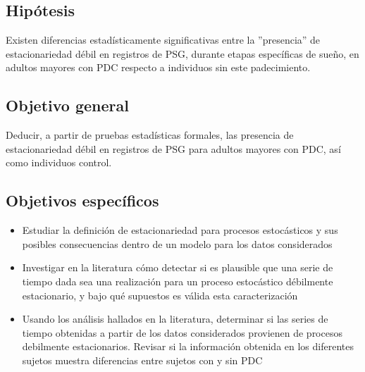 \documentclass[12pt,a4paper]{mitthesis}
\begin{document}

\subsection{Hip\'otesis}

Existen diferencias estad\'isticamente significativas entre la ''presencia'' de estacionariedad 
d\'ebil en registros de PSG, durante etapas espec\'ificas de sue\~no, en adultos mayores con PDC 
respecto a individuos sin este padecimiento.


\subsection{Objetivo general}

Deducir, a partir de pruebas estad\'isticas formales, las presencia de estacionariedad d\'ebil en
registros de PSG para adultos mayores con PDC, as\'i como individuos control.


\subsection{Objetivos espec\'ificos}

\begin{itemize}
\item Estudiar la definici\'on de estacionariedad para procesos estoc\'asticos y sus posibles 
consecuencias dentro de un modelo para los datos considerados

\item Investigar en la literatura c\'omo detectar si es plausible que una serie de tiempo dada sea 
una realizaci\'on para un proceso estoc\'astico d\'ebilmente estacionario, y bajo qu\'e supuestos 
es v\'alida esta caracterizaci\'on

\item Usando los an\'alisis hallados en la literatura, determinar si las series de tiempo 
obtenidas a partir de los datos considerados provienen de procesos debilmente estacionarios.
Revisar si la informaci\'on obtenida en los diferentes sujetos muestra diferencias entre sujetos 
con y sin PDC
\end{itemize}
\end{document}
